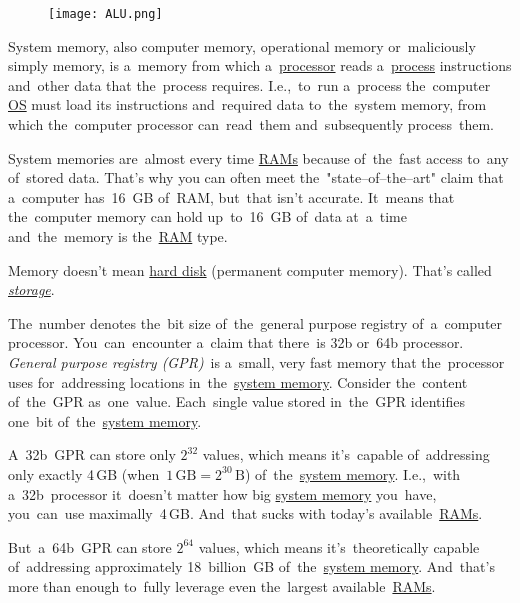 \begin{figure}
    \centering
    \texttt{[image: ALU.png]}
\end{figure}
\newpage

\label{systemmemory}
System memory, also computer memory, operational memory or~maliciously simply memory, is a~memory from which a~\hyperref[processorcpucore]{processor} reads a~\hyperref[applicationprocessprogramservicethread]{process} instructions and~other data that the~process requires.
I.e.,~to~run a~process the~computer \hyperref[os]{OS} must load its instructions and~required data to~the~system memory, from which the~computer processor can~read~them and~subsequently process~them.

System memories are~almost every time \hyperref[ram]{RAMs} because of~the~fast access to~any of~stored data.
That's why you can often meet the~"state--of--the--art" claim that a~computer has~16~GB of~RAM, but~that isn't accurate.
It~means that the~computer memory can hold up~to~16~GB of~data at~a~time and~the~memory is the~\hyperref[ram]{RAM} type.

\warning Memory doesn't mean \hyperref[harddiskdrive]{hard disk} (permanent computer memory).
That's called \hyperref[harddiskdrive]{\textit{storage}}.

\label{32bvs64b}
The~number denotes the~bit size of~the~general purpose registry of~a~computer processor.
You~can~encounter a~claim that there~is 32b or~64b processor.
\textit{General purpose registry (GPR)}~is a~small, very fast memory that the~processor uses for~addressing locations in~the~\hyperref[systemmemory]{system memory}.
Consider the~content of~the~GPR as~one~value.
Each~single value stored in~the~GPR identifies one~bit of~the~\hyperref[systemmemory]{system memory}.

A~32b~GPR can store only $2^{32}$ values, which means it's~capable of~addressing only exactly 4\,GB (when~$1\,\textrm{GB}=2^{30}\,\textrm{B}$) of~the~\hyperref[systemmemory]{system memory}.
I.e.,~with a~32b~processor it~doesn't matter how big \hyperref[systemmemory]{system memory} you~have, you~can~use maximally~4\,GB.
And~that sucks with today's available~\hyperref[ram]{RAMs}.

But~a~64b~GPR can store $2^{64}$ values, which means it's~theoretically capable of~addressing approximately 18~billion~GB of~the~\hyperref[systemmemory]{system memory}.
And~that's more than enough to~fully leverage even the~largest available~\hyperref[ram]{RAMs}.

